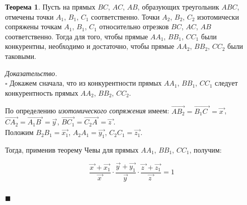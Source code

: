 \documentclass[14pt]{extarticle}
\let\vecarrow\overrightarrow
\theoremstyle{definition}
\theoremstyle{theorem}
\newtheorem*{theorem}{Теорема}
\renewenvironment{proof}
    {\noindent \textit{Доказательство.}\\
	\indent $\square$}
	{ $\blacksquare$\\ }
\begin{document}
\begin{theorem}
Пусть на прямых \(BC\), \(AC\), \(AB\), образующих треугольник \(ABC\),
отмечены точки \(A_1\), \(B_1\), \(C_1\) соответственно. Точки
\(A_2\), \(B_2\), \(C_2\) изотомически сопряжены точкам \(A_1\), \(B_1\), 
\(C_1\) относительно отрезков \(BC\), \(AC\), \(AB\) соответственно.
Тогда для того, чтобы прямые \(AA_1\), \(BB_1\), \(CC_1\) были конкурентны,
необходимо и достаточно, чтобы прямые \(AA_2\), \(BB_2\), \(CC_2\) были таковыми.
\end{theorem}


\begin{proof}
Докажем сначала, что из конкурентности прямых \(AA_1\), \(BB_1\), \(CC_1\)
следует конкурентность прямых \(AA_2\), \(BB_2\), \(CC_2\). 

\begin{figure}
\end{figure}

По определению \textit{изотомического сопряжения}
имеем: \(\vecarrow{AB_2} = \vecarrow{B_1C_{\: \,}} = 
\vecarrow{x_{\,}}\), \(\vecarrow{CA_2} = \vecarrow{A_1B_{\;}} = 
\vecarrow{y_{\,}}\), \(\vecarrow{BC_1} = \vecarrow{C_2A_{\:}} =
\vecarrow{z_{\, \,}}\).\\
Положим \(B_2B_1 = \vecarrow{x_1}\), \(A_2A_1 = \vecarrow{y_1}\), \(C_2C_1 = 
\vecarrow{z_1}\).

Тогда, применив теорему Чевы для прямых \(AA_1\), \(BB_1\), \(CC_1\),
получим:

\[
\frac{\vecarrow{x_{\,}} + \vecarrow{x_1}}{\vecarrow{x_{\,}}} \cdot
\frac{\vecarrow{y_{\,}} + \vecarrow{y_1}}{\vecarrow{y_{\,}}} \cdot
\frac{\vecarrow{z_{\, \,}} + \vecarrow{z_1}}{\vecarrow{z_{\, \,}}} 
= 1
\] \\



\end{proof}
\end{document}
